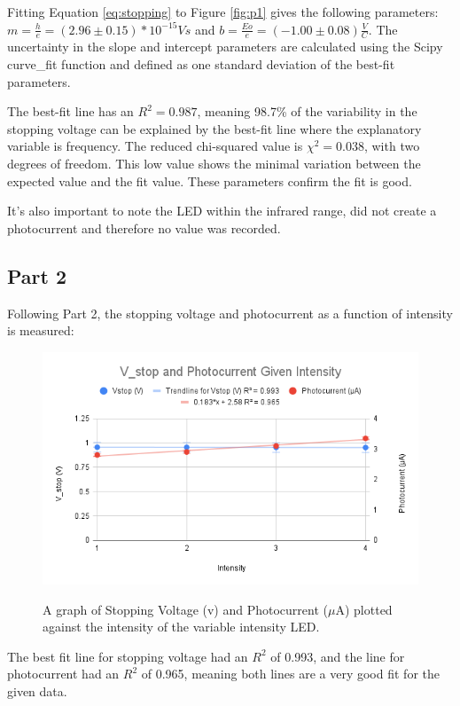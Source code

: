 \documentclass[12pt,twocolumn]{article}
\begin{document}
Fitting Equation \ref{eq:stopping} to Figure \ref{fig:p1} gives the following parameters: $m = \frac{h}{e} = (2.96 \pm 0.15)*10^{-15} Vs$ and $b = \frac{Eo}{e} = (-1.00 \pm 0.08) \frac{V}{C}$. 
The uncertainty in the slope and intercept parameters are calculated using the Scipy curve\_fit function and defined as one standard deviation of the best-fit parameters.

The best-fit line has an $R^2 = 0.987$, meaning 98.7\% of the variability in the stopping voltage can be explained by the best-fit line where the explanatory variable is frequency. 
The reduced chi-squared value is $\chi^2=0.038$, with two degrees of freedom. This low value shows the minimal variation between the expected value and the fit value. These parameters confirm the fit is good.

It's also important to note the LED within the infrared range, did not create a photocurrent and therefore no value was recorded.

\subsection*{Part 2}
Following Part 2, the stopping voltage and photocurrent as a function of intensity is measured:

\begin{figure}[H]
\begin{centering}
\includegraphics[width=0.5 \textwidth]{img/V_stop and Photocurrent Given Intensity.png}
\label{fig:p2}
\caption{A graph of Stopping Voltage (v) and Photocurrent ($\mu$A) plotted against the intensity of the variable intensity LED. }
\end{centering}
\end{figure}

The best fit line for stopping voltage had an $R^2$ of 0.993, and the line for photocurrent had an $R^2$ of 0.965, meaning both lines are a very good fit for the given data.
\end{document}
